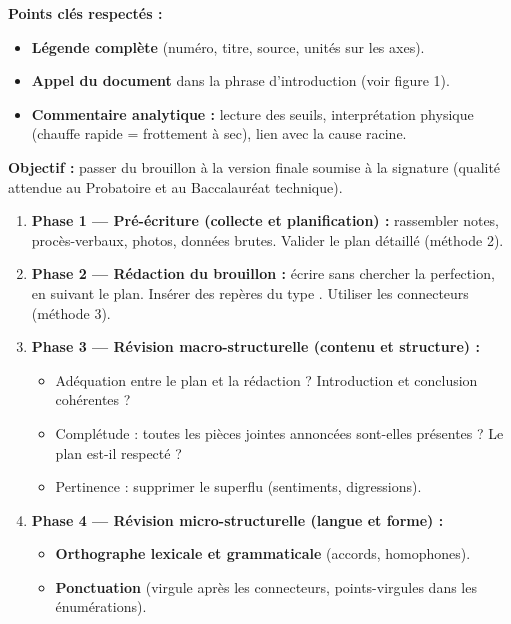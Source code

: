 \documentclass[11pt]{article}
\begin{document}
\begin{exoresolu}
    \textbf{Points clés respectés :}
    \begin{itemize}
        \item \textbf{Légende complète} (numéro, titre, source, unités sur les axes).
        \item \textbf{Appel du document} dans la phrase d'introduction (\og voir figure 1\fg).
        \item \textbf{Commentaire analytique :} lecture des seuils, interprétation physique (chauffe rapide = frottement à sec), lien avec la cause racine.
    \end{itemize}
\end{exoresolu}

\begin{methode}
    \textbf{Objectif :} passer du brouillon à la version finale soumise à la signature (qualité attendue au Probatoire et au Baccalauréat technique).
    \begin{enumerate}
        \item \textbf{Phase 1 — Pré-écriture (collecte et planification) :} rassembler notes, procès-verbaux, photos, données brutes. Valider le plan détaillé (méthode 2).
        \item \textbf{Phase 2 — Rédaction du brouillon :} écrire sans chercher la perfection, en suivant le plan. Insérer des repères du type \fg. Utiliser les connecteurs (méthode 3).
        \item \textbf{Phase 3 — Révision macro-structurelle (contenu et structure) :}
        \begin{itemize}
            \item Adéquation entre le plan et la rédaction ? Introduction et conclusion cohérentes ?
            \item Complétude : toutes les pièces jointes annoncées sont-elles présentes ? Le plan est-il respecté ?
            \item Pertinence : supprimer le superflu (sentiments, digressions).
        \end{itemize}
        \item \textbf{Phase 4 — Révision micro-structurelle (langue et forme) :}
        \begin{itemize}
            \item \textbf{Orthographe lexicale et grammaticale} (accords, homophones).
            \item \textbf{Ponctuation} (virgule après les connecteurs, points-virgules dans les énumérations).

\end{itemize}
\end{enumerate}
\end{methode}
\end{document}
